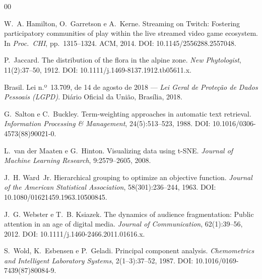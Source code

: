 \documentclass[a4,11pt]{wmecai}
\begin{document}
\begin{thebibliography}{00}

W.~A. Hamilton, O.~Garretson e A.~Kerne.
Streaming on Twitch: Fostering participatory communities of play
within the live streamed video game ecosystem.
In {\it Proc.\ CHI}, pp.~1315--1324. ACM, 2014.
DOI: 10.1145/2556288.2557048.

P.~Jaccard.
The distribution of the flora in the alpine zone.
{\it New Phytologist}, 11(2):37--50, 1912.
DOI: 10.1111/j.1469-8137.1912.tb05611.x.

Brasil.
Lei n.º~13.709, de 14 de agosto de 2018 ---
{\it Lei Geral de Proteção de Dados Pessoais (LGPD)}.
Diário Oficial da União, Brasília, 2018.

G.~Salton e C.~Buckley.
Term-weighting approaches in automatic text retrieval.
{\it Information Processing \& Management}, 24(5):513--523, 1988.
DOI: 10.1016/0306-4573(88)90021-0.

L.~van der Maaten e G.~Hinton.
Visualizing data using t-SNE.
{\it Journal of Machine Learning Research}, 9:2579--2605, 2008.

J.~H. Ward~Jr.
Hierarchical grouping to optimize an objective function.
{\it Journal of the American Statistical Association},
58(301):236--244, 1963.
DOI: 10.1080/01621459.1963.10500845.

J.~G. Webster e T.~B. Ksiazek.
The dynamics of audience fragmentation: Public attention in an age
of digital media.
{\it Journal of Communication}, 62(1):39--56, 2012.
DOI: 10.1111/j.1460-2466.2011.01616.x.

S.~Wold, K.~Esbensen e P.~Geladi.
Principal component analysis.
{\it Chemometrics and Intelligent Laboratory Systems},
2(1--3):37--52, 1987.
DOI: 10.1016/0169-7439(87)80084-9.

\end{thebibliography}
\end{document}
